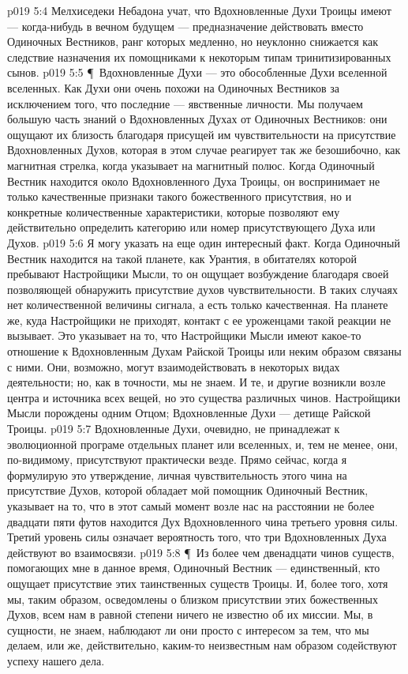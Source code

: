 \vs p019 5:4 Мелхиседеки Небадона учат, что Вдохновленные Духи Троицы имеют --- когда\hyp{}нибудь в вечном будущем --- предназначение действовать вместо Одиночных Вестников, ранг которых медленно, но неуклонно снижается как следствие назначения их помощниками к некоторым типам тринитизированных сынов.
\vs p019 5:5 \P\ Вдохновленные Духи --- это обособленные Духи вселенной вселенных. Как Духи они очень похожи на Одиночных Вестников за исключением того, что последние --- явственные личности. Мы получаем большую часть знаний о Вдохновленных Духах от Одиночных Вестников: они ощущают их близость благодаря присущей им чувствительности на присутствие Вдохновленных Духов, которая в этом случае реагирует так же безошибочно, как магнитная стрелка, когда указывает на магнитный полюс. Когда Одиночный Вестник находится около Вдохновленного Духа Троицы, он воспринимает не только качественные признаки такого божественного присутствия, но и конкретные количественные характеристики, которые позволяют ему действительно определить категорию или номер присутствующего Духа или Духов.
\vs p019 5:6 Я могу указать на еще один интересный факт. Когда Одиночный Вестник находится на такой планете, как Урантия, в обитателях которой пребывают Настройщики Мысли, то он ощущает возбуждение благодаря своей позволяющей обнаружить присутствие духов чувствительности. В таких случаях нет количественной величины сигнала, а есть только качественная. На планете же, куда Настройщики не приходят, контакт с ее уроженцами такой реакции не вызывает. Это указывает на то, что Настройщики Мысли имеют какое\hyp{}то отношение к Вдохновленным Духам Райской Троицы или неким образом связаны с ними. Они, возможно, могут взаимодействовать в некоторых видах деятельности; но, как в точности, мы не знаем. И те, и другие возникли возле центра и источника всех вещей, но это существа различных чинов. Настройщики Мысли порождены одним Отцом; Вдохновленные Духи --- детище Райской Троицы.
\vs p019 5:7 Вдохновленные Духи, очевидно, не принадлежат к эволюционной програме отдельных планет или вселенных, и, тем не менее, они, по\hyp{}видимому, присутствуют практически везде. Прямо сейчас, когда я формулирую это утверждение, личная чувствительность этого чина на присутствие Духов, которой обладает мой помощник Одиночный Вестник, указывает на то, что в этот самый момент возле нас на расстоянии не более двадцати пяти футов находится Дух Вдохновленного чина третьего уровня силы. Третий уровень силы означает вероятность того, что три Вдохновленных Духа действуют во взаимосвязи.
\vs p019 5:8 \P\ Из более чем двенадцати чинов существ, помогающих мне в данное время, Одиночный Вестник --- единственный, кто ощущает присутствие этих таинственных существ Троицы. И, более того, хотя мы, таким образом, осведомлены о близком присутствии этих божественных Духов, всем нам в равной степени ничего не известно об их миссии. Мы, в сущности, не знаем, наблюдают ли они просто с интересом за тем, что мы делаем, или же, действительно, каким\hyp{}то неизвестным нам образом содействуют успеху нашего дела.
